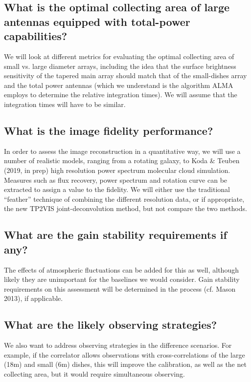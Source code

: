 \documentclass[11pt,twoside]{article}
\begin{document}
\subsection{What is the optimal collecting area of large antennas equipped with total-power capabilities?}


We will look at different metrics for evaluating the optimal
collecting area of small vs. large diameter arrays, including the idea
that the surface brightness sensitivity of the tapered main array
should match that of the small-dishes array and the total power
antennas (which we understand is the algorithm ALMA employs to
determine the relative integration times). We will assume that the
integration times will have to be similar.


\subsection{What is the image fidelity performance?}


In order to assess the image reconstruction in a quantitative way, we
will use a number of realistic models, ranging from a rotating galaxy,
to Koda \& Teuben (2019, in prep) high resolution power spectrum
molecular cloud simulation. Measures such as flux recovery, power
spectrum and rotation curve can be extracted to assign a value to the
fidelity. We will either use the traditional ``feather''
technique of combining the different resolution data, or if
appropriate, the new TP2VIS joint-deconvolution method, but not
compare the two methods.


\subsection{What are the gain stability requirements if any?}


The effects of atmospheric fluctuations can be added for this as well,
although likely they are unimportant for the baselines we would
consider. Gain stability requirements on this assessment will be
determined in the process (cf. Mason 2013), if applicable.


\subsection{What are the likely observing strategies?}


We also want to address observing strategies in the difference
scenarios. For example, if the correlator allows observations with
cross-correlations of the large (18m) and small (6m) dishes, this will
improve the calibration, as well as the net collecting area, but it
would require simultaneous observing.
\end{document}
